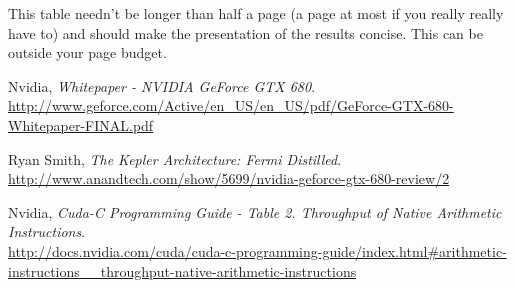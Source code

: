 \documentclass[11pt, oneside, a4paper]{article}
\begin{document}
This table needn't be longer than half a page (a page at most if you really really have to) and should make the presentation of the results concise.  This can be outside your page budget.


\clearpage




\begin{thebibliography}{9}

	Nvidia,
	\emph{Whitepaper - NVIDIA GeForce GTX 680}. \\
	\url{http://www.geforce.com/Active/en_US/en_US/pdf/GeForce-GTX-680-Whitepaper-FINAL.pdf}

	Ryan Smith,
	\emph{The Kepler Architecture: Fermi Distilled}. \\
	\url{http://www.anandtech.com/show/5699/nvidia-geforce-gtx-680-review/2}

	Nvidia,
	\emph{Cuda-C Programming Guide - Table 2. Throughput of Native Arithmetic Instructions}. \\
	\url{http://docs.nvidia.com/cuda/cuda-c-programming-guide/index.html#arithmetic-instructions__throughput-native-arithmetic-instructions}

\end{thebibliography}
\end{document}
